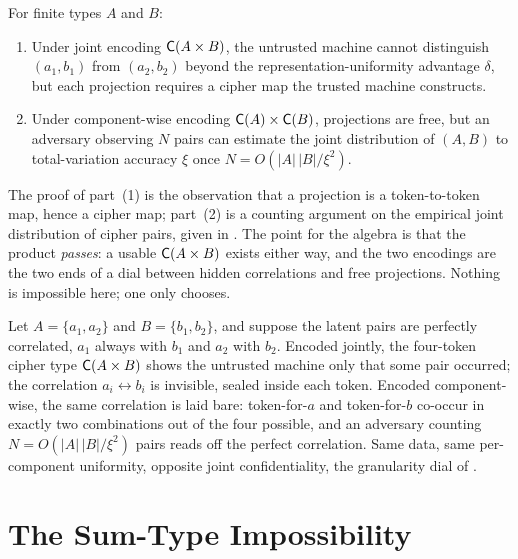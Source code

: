 \begin{proposition}
\label{prop:product-tradeoff}
For finite types $A$ and $B$:
\begin{enumerate}
\item Under joint encoding $\mathsf{C}(A \times B)$, the untrusted machine
  cannot distinguish $(a_1, b_1)$ from $(a_2, b_2)$ beyond the
  representation-uniformity advantage $\delta$, but each projection requires
  a cipher map the trusted machine constructs.
\item Under component-wise encoding $\mathsf{C}(A) \times \mathsf{C}(B)$,
  projections are free, but an adversary observing $N$ pairs can estimate
  the joint distribution of $(A, B)$ to total-variation accuracy $\xi$ once
  $N = O(\lvert A\rvert\,\lvert B\rvert / \xi^2)$.
\end{enumerate}
\end{proposition}

The proof of part~(1) is the observation that a projection is a token-to-token
map, hence a cipher map; part~(2) is a counting argument on the empirical
joint distribution of cipher pairs, given in \cite{towell2026algebraic}. The
point for the algebra is that the product \emph{passes}: a usable
$\mathsf{C}(A \times B)$ exists either way, and the two encodings are the two
ends of a dial between hidden correlations and free projections. Nothing is
impossible here; one only chooses.

\begin{example}
\label{ex:product-pair}
Let $A = \{a_1, a_2\}$ and $B = \{b_1, b_2\}$, and suppose the latent pairs
are perfectly correlated, $a_1$ always with $b_1$ and $a_2$ with $b_2$.
Encoded jointly, the four-token cipher type $\mathsf{C}(A \times B)$ shows the
untrusted machine only that some pair occurred; the correlation $a_i
\leftrightarrow b_i$ is invisible, sealed inside each token. Encoded
component-wise, the same correlation is laid bare: token-for-$a$ and
token-for-$b$ co-occur in exactly two combinations out of the four possible,
and an adversary counting $N = O(\lvert A\rvert\,\lvert B\rvert/\xi^2)$ pairs
reads off the perfect correlation. Same data, same per-component uniformity,
opposite joint confidentiality, the granularity dial of
.
\end{example}

\section{The Sum-Type Impossibility}
\label{sec:sum-impossibility}

